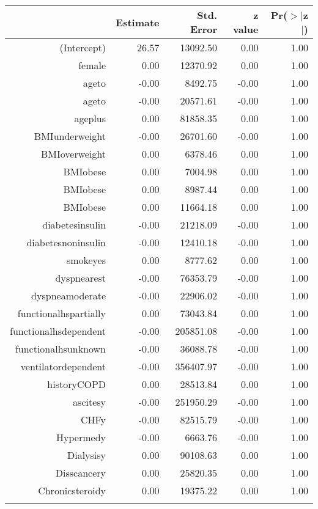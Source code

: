 \begin{tabular}{rrrrr}
  \hline
 & Estimate & Std. Error & z value & Pr($>$$|$z$|$) \\ 
  \hline
(Intercept) & 26.57 & 13092.50 & 0.00 & 1.00 \\ 
  female & 0.00 & 12370.92 & 0.00 & 1.00 \\ 
  age\-65\-to\-74 & -0.00 & 8492.75 & -0.00 & 1.00 \\ 
  age\-75\-to\-84 & -0.00 & 20571.61 & -0.00 & 1.00 \\ 
  age\-85\-plus & 0.00 & 81858.35 & 0.00 & 1.00 \\ 
  BMI\-underweight & -0.00 & 26701.60 & -0.00 & 1.00 \\ 
  BMI\-overweight & 0.00 & 6378.46 & 0.00 & 1.00 \\ 
  BMI\-obese\-1 & 0.00 & 7004.98 & 0.00 & 1.00 \\ 
  BMI\-obese\-2 & 0.00 & 8987.44 & 0.00 & 1.00 \\ 
  BMI\-obese\-3 & 0.00 & 11664.18 & 0.00 & 1.00 \\ 
  diabetes\-insulin & -0.00 & 21218.09 & -0.00 & 1.00 \\ 
  diabetes\-noninsulin & -0.00 & 12410.18 & -0.00 & 1.00 \\ 
  smoke\-yes & 0.00 & 8777.62 & 0.00 & 1.00 \\ 
  dyspnea\-rest & -0.00 & 76353.79 & -0.00 & 1.00 \\ 
  dyspnea\-moderate & -0.00 & 22906.02 & -0.00 & 1.00 \\ 
  functional\-hs\-partially & 0.00 & 73043.84 & 0.00 & 1.00 \\ 
  functional\-hs\-dependent & -0.00 & 205851.08 & -0.00 & 1.00 \\ 
  functional\-hs\-unknown & -0.00 & 36088.78 & -0.00 & 1.00 \\ 
  ventilator\-dependent & -0.00 & 356407.97 & -0.00 & 1.00 \\ 
  history\-COPD & 0.00 & 28513.84 & 0.00 & 1.00 \\ 
  ascites\-y & -0.00 & 251950.29 & -0.00 & 1.00 \\ 
  CHF\-y & -0.00 & 82515.79 & -0.00 & 1.00 \\ 
  Hyper\-med\-y & -0.00 & 6663.76 & -0.00 & 1.00 \\ 
  Dialysis\-y & 0.00 & 90108.63 & 0.00 & 1.00 \\ 
  Diss\-cancer\-y & 0.00 & 25820.35 & 0.00 & 1.00 \\ 
  Chronic\-steroid\-y & 0.00 & 19375.22 & 0.00 & 1.00 \\ 
$$
\end{tabular}
